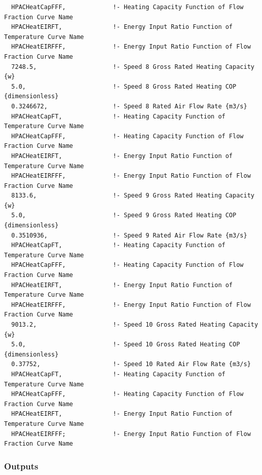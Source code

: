 \begin{lstlisting}
  HPACHeatCapFFF,             !- Heating Capacity Function of Flow Fraction Curve Name
  HPACHeatEIRFT,              !- Energy Input Ratio Function of Temperature Curve Name
  HPACHeatEIRFFF,             !- Energy Input Ratio Function of Flow Fraction Curve Name
  7248.5,                     !- Speed 8 Gross Rated Heating Capacity {w}
  5.0,                        !- Speed 8 Gross Rated Heating COP {dimensionless}
  0.3246672,                  !- Speed 8 Rated Air Flow Rate {m3/s}
  HPACHeatCapFT,              !- Heating Capacity Function of Temperature Curve Name
  HPACHeatCapFFF,             !- Heating Capacity Function of Flow Fraction Curve Name
  HPACHeatEIRFT,              !- Energy Input Ratio Function of Temperature Curve Name
  HPACHeatEIRFFF,             !- Energy Input Ratio Function of Flow Fraction Curve Name
  8133.6,                     !- Speed 9 Gross Rated Heating Capacity {w}
  5.0,                        !- Speed 9 Gross Rated Heating COP {dimensionless}
  0.3510936,                  !- Speed 9 Rated Air Flow Rate {m3/s}
  HPACHeatCapFT,              !- Heating Capacity Function of Temperature Curve Name
  HPACHeatCapFFF,             !- Heating Capacity Function of Flow Fraction Curve Name
  HPACHeatEIRFT,              !- Energy Input Ratio Function of Temperature Curve Name
  HPACHeatEIRFFF,             !- Energy Input Ratio Function of Flow Fraction Curve Name
  9013.2,                     !- Speed 10 Gross Rated Heating Capacity {w}
  5.0,                        !- Speed 10 Gross Rated Heating COP {dimensionless}
  0.37752,                    !- Speed 10 Rated Air Flow Rate {m3/s}
  HPACHeatCapFT,              !- Heating Capacity Function of Temperature Curve Name
  HPACHeatCapFFF,             !- Heating Capacity Function of Flow Fraction Curve Name
  HPACHeatEIRFT,              !- Energy Input Ratio Function of Temperature Curve Name
  HPACHeatEIRFFF;             !- Energy Input Ratio Function of Flow Fraction Curve Name
\end{lstlisting}

\subsubsection{Outputs}\label{outputs-17}

